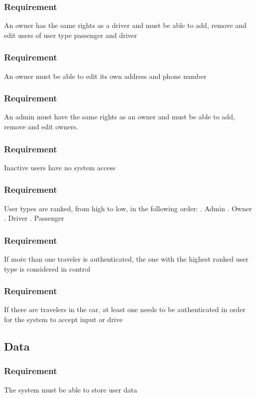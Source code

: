 \documentclass{article}
\begin{document}
{      \subsubsection{Requirement}
\hfill \break 
\- \- \-An owner has the same rights as a driver and must be able to add, remove and edit users of user type passenger and driver
      \subsubsection{Requirement}
\hfill \break 
\- \- \-An owner must be able to edit its own address and phone number
      \subsubsection{Requirement}
\hfill \break 
\- \- \-An admin must have the same rights as an owner and must be able to add, remove and edit owners.
      \subsubsection{Requirement}
\hfill \break 
\- \- \-Inactive users have no system access
      \subsubsection{Requirement}
\hfill \break 
\- \- \-User types are ranked, from high to low, in the following order:
\hfill \break 
{}. Admin
\hfill \break 
{}. Owner
\hfill \break 
{}. Driver
\hfill \break 
{}. Passenger
      \subsubsection{Requirement}
\hfill \break 
\- \- \-If more than one traveler is authenticated, the one with the highest ranked user type is considered in control
      \subsubsection{Requirement}
\hfill \break 
\- \- \-If there are travelers in the car, at least one needs to be authenticated in order for the system to accept input or drive
  \subsection{Data}
      \subsubsection{Requirement}
\hfill \break 
\- \- \-The system must be able to store user data
}
\end{document}
